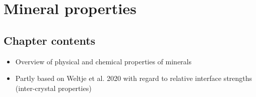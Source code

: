 \chapter{Mineral properties}\label{ch:mineral_properties}

\section{Chapter contents}
\begin{itemize}
    \item Overview of physical and chemical properties of minerals
    \item Partly based on Weltje et al. 2020 with regard to relative interface strengths (inter-crystal properties)

\end{itemize}




\cleardoublepage

